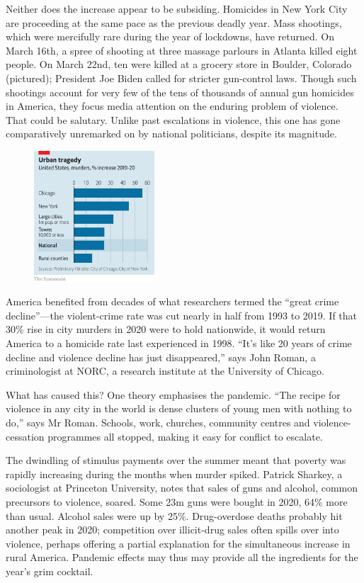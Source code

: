 \documentclass{article}
\begin{document}
Neither does the increase appear to be subsiding. Homicides in New York City are proceeding at the same pace as the previous deadly year. Mass shootings, which were mercifully rare during the year of lockdowns, have returned. On March 16th, a spree of shooting at three massage parlours in Atlanta killed eight people. On March 22nd, ten were killed at a grocery store in Boulder, Colorado (pictured); President Joe Biden called for stricter gun-control laws. Though such shootings account for very few of the tens of thousands of annual gun homicides in America, they focus media attention on the enduring problem of violence. That could be salutary. Unlike past escalations in violence, this one has gone comparatively unremarked on by national politicians, despite its magnitude. 

\begin{figure}[h]
\centering
\includegraphics[width=0.4\textwidth]{images/20210327_USC300.png}
\end{figure}


America benefited from decades of what researchers termed the ``great crime decline''---the violent-crime rate was cut nearly in half from 1993 to 2019. If that 30\% rise in city murders in 2020 were to hold nationwide, it would return America to a homicide rate last experienced in 1998. ``It's like 20 years of crime decline and violence decline has just disappeared,'' says John Roman, a criminologist at NORC, a research institute at the University of Chicago. 

What has caused this? One theory emphasises the pandemic. ``The recipe for violence in any city in the world is dense clusters of young men with nothing to do,'' says Mr Roman. Schools, work, churches, community centres and violence-cessation programmes all stopped, making it easy for conflict to escalate. 

The dwindling of stimulus payments over the summer meant that poverty was rapidly increasing during the months when murder spiked. Patrick Sharkey, a sociologist at Princeton University, notes that sales of guns and alcohol, common precursors to violence, soared. Some 23m guns were bought in 2020, 64\% more than usual. Alcohol sales were up by 25\%. Drug-overdose deaths probably hit another peak in 2020; competition over illicit-drug sales often spills over into violence, perhaps offering a partial explanation for the simultaneous increase in rural America. Pandemic effects may thus may provide all the ingredients for the year's grim cocktail. 
\end{document}

